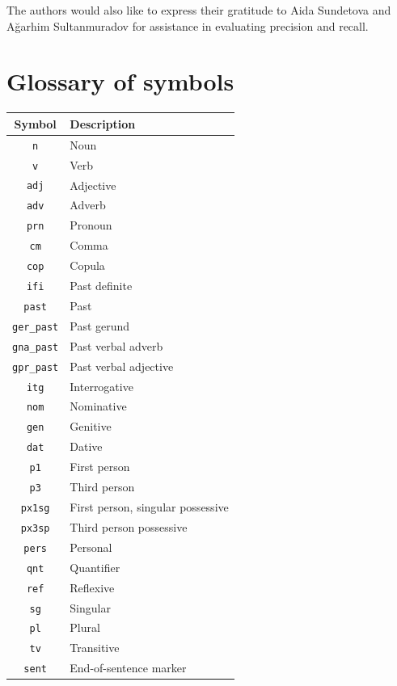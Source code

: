 \documentclass[a4paper,11pt,twocolumn]{article}
\newcommand{\tags}[1]{\texttt{#1}}
\begin{document}
The authors would also like to express their gratitude to Aida Sundetova and Ağarhim Sultanmuradov
for assistance in evaluating precision and recall.




\appendix 

\section{Glossary of symbols}
\label{app:glossary}
\centering
\begin{tabular}{cl}
\toprule
 \textbf{Symbol} & \textbf{Description}\\
\midrule
 \tags{n} & Noun  \\
 \tags{v} & Verb  \\
 \tags{adj} & Adjective  \\
 \tags{adv} & Adverb  \\
 \tags{prn} & Pronoun  \\
 \tags{cm} &  Comma \\
 \tags{cop} & Copula  \\
 \tags{ifi} & Past definite  \\
 \tags{past} & Past  \\
 \tags{ger\_past} & Past gerund \\
 \tags{gna\_past} & Past verbal adverb  \\
 \tags{gpr\_past} & Past verbal adjective  \\
 \tags{itg} & Interrogative  \\
 \tags{nom} &  Nominative \\
 \tags{gen} & Genitive  \\
 \tags{dat} & Dative  \\
 \tags{p1} & First person  \\
 \tags{p3} & Third person  \\
 \tags{px1sg} & First person, singular possessive  \\
 \tags{px3sp} & Third person possessive  \\
 \tags{pers} & Personal  \\
 \tags{qnt} & Quantifier  \\
 \tags{ref} & Reflexive  \\
 \tags{sg} & Singular  \\
 \tags{pl} &  Plural \\
 \tags{tv} & Transitive  \\
 \tags{sent} & End-of-sentence marker  \\

\bottomrule

\end{tabular}
\end{document}
